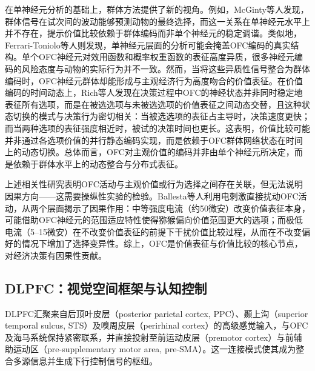 在单神经元分析的基础上，群体方法提供了新的视角。例如，McGinty等人发现，群体信号在试次间的波动能够预测动物的最终选择，而这一关系在单神经元水平上并不存在，提示价值比较依赖于群体编码而非单个神经元的稳定调谐\cite{mcginty2023behavioral}。类似地，Ferrari-Toniolo等人则发现，单神经元层面的分析可能会掩盖OFC编码的真实结构。单个OFC神经元对效用函数和概率权重函数的表征高度异质，很多神经元编码的风险态度与动物的实际行为并不一致。然而，当将这些异质性信号整合为群体编码时，OFC神经元群体却能形成与主观经济行为高度吻合的价值表征\cite{ferraritoniolo2023reliable}。在价值编码的时间动态上，Rich等人发现在决策过程中OFC的神经状态并非同时稳定地表征所有选项，而是在被选选项与未被选选项的价值表征之间动态交替，且这种状态切换的模式与决策行为密切相关：当被选选项的表征占主导时，决策速度更快；而当两种选项的表征强度相近时，被试的决策时间也更长。这表明，价值比较可能并非通过各选项价值的并行静态编码实现，而是依赖于OFC群体网络状态在时间上的动态切换\cite{rich2016decoding}。总体而言，OFC对主观价值的编码并非由单个神经元所决定，而是依赖于群体水平上的动态整合与分布式表征。

上述相关性研究表明OFC活动与主观价值或行为选择之间存在关联，但无法说明因果方向——这需要操纵性实验的检验。Ballesta等人利用电刺激直接扰动OFC活动，从两个层面揭示了因果作用：中等强度电流（约50微安）改变价值表征本身，可能借助OFC神经元的范围适应特性使得猕猴偏向价值范围更大的选项；而极低电流（5--15微安）在不改变价值表征的前提下干扰价值比较过程，从而在不改变偏好的情况下增加了选择变异性\cite{ballesta2020values, ballesta2022orbitofrontal}。综上，OFC是价值表征与价值比较的核心节点，对经济决策有因果性贡献。

\subsection{DLPFC：视觉空间框架与认知控制}\label{chap1:DLPFC}
DLPFC汇聚来自后顶叶皮层（posterior parietal cortex, PPC）、颞上沟（superior temporal sulcus, STS）及嗅周皮层（perirhinal cortex）的高级感觉输入，与OFC及海马系统保持紧密联系，并直接投射至前运动皮层（premotor cortex）与前辅助运动区（pre-supplementary motor area, pre-SMA）。这一连接模式使其成为整合多源信息并生成下行控制信号的枢纽\cite{passingham2012neurobiology}。

